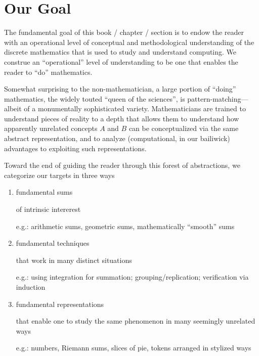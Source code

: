 \documentclass{article}
\begin{document}
\section{Our Goal}



The fundamental goal of this book / chapter / section is to endow the
reader with an operational level of conceptual and methodological
understanding of the discrete mathematics that is used to study and
understand computing.  We construe an ``operational'' level of
understanding to be one that enables the reader to ``do'' mathematics.

Somewhat surprising to the non-mathematician, a large portion of
``doing'' mathematics, the widely touted ``queen of the sciences'', is
pattern-matching---albeit of a monumentally sophisticated variety.
Mathematicians are trained to understand pieces of reality to a depth
that allows them to understand how apparently unrelated concepts $A$
and $B$ can be conceptualized via the same abstract representation,
and to analyze (computational, in our bailiwick) advantages to
exploiting such representations.

Toward the end of guiding the reader through this forest of
abstractions, we categorize our targets in three ways
\begin{enumerate}
\item
fundamental sums

of intrinsic intererest

e.g.: arithmetic sums, geometric sums, mathematically ``smooth'' sums

\item
fundamental techniques

that work in many distinct situations

e.g.: using integration for summation; grouping/replication; verification via induction

\item
fundamental representations

that enable one to study the same phenomenon in many seemingly unrelated ways

e.g.: numbers, Riemann sums, slices of pie, tokens arranged in stylized ways
\end{enumerate}
\end{document}
